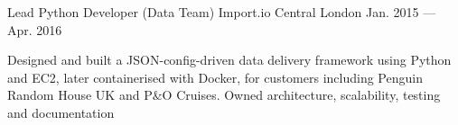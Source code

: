 \begin{cventries}
  \cventry
  {Lead Python Developer (Data Team)} %
  {Import.io} %
  {Central London} %
  {Jan. 2015 --- Apr. 2016} %
  {
    \begin{cvitems} %
    \item {Designed and built a JSON-config-driven data delivery framework using Python and EC2, later containerised with Docker, for customers including Penguin Random House UK and P\&O Cruises. Owned architecture, scalability, testing and documentation}
    \end{cvitems}
  }

\end{cventries}

